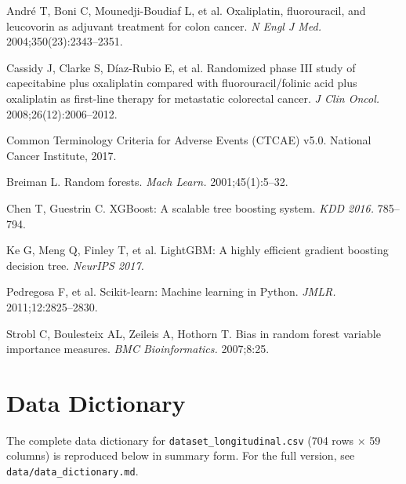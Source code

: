 \documentclass[12pt,a4paper]{report}
\begin{document}
\begin{enumerate}[label={[\arabic*]}]
  \item André T, Boni C, Mounedji-Boudiaf L, et al. Oxaliplatin, fluorouracil, and leucovorin as adjuvant treatment for colon cancer. \textit{N Engl J Med.} 2004;350(23):2343--2351.
  \item Cassidy J, Clarke S, Díaz-Rubio E, et al. Randomized phase III study of capecitabine plus oxaliplatin compared with fluorouracil/folinic acid plus oxaliplatin as first-line therapy for metastatic colorectal cancer. \textit{J Clin Oncol.} 2008;26(12):2006--2012.
  \item Common Terminology Criteria for Adverse Events (CTCAE) v5.0. National Cancer Institute, 2017.
  \item Breiman L. Random forests. \textit{Mach Learn.} 2001;45(1):5--32.
  \item Chen T, Guestrin C. XGBoost: A scalable tree boosting system. \textit{KDD 2016.} 785--794.
  \item Ke G, Meng Q, Finley T, et al. LightGBM: A highly efficient gradient boosting decision tree. \textit{NeurIPS 2017.}
  \item Pedregosa F, et al. Scikit-learn: Machine learning in Python. \textit{JMLR.} 2011;12:2825--2830.
  \item Strobl C, Boulesteix AL, Zeileis A, Hothorn T. Bias in random forest variable importance measures. \textit{BMC Bioinformatics.} 2007;8:25.
\end{enumerate}

\appendix

\chapter{Data Dictionary}
\label{app:dict}

The complete data dictionary for \texttt{dataset\_longitudinal.csv} (704 rows $\times$ 59 columns) is reproduced below in summary form. For the full version, see \texttt{data/data\_dictionary.md}.
\end{document}
